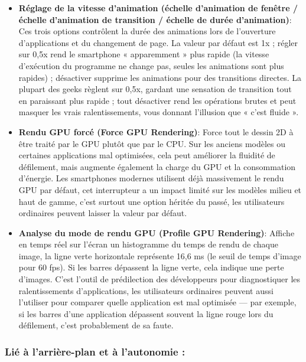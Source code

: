 \begin{itemize}
  \item \textbf{Réglage de la vitesse d'animation (échelle d'animation de fenêtre / échelle d'animation de transition / échelle de durée d'animation)}: Ces trois options contrôlent la durée des animations lors de l'ouverture d'applications et du changement de page. La valeur par défaut est 1x ; régler sur 0,5x rend le smartphone « apparemment » plus rapide (la vitesse d'exécution du programme ne change pas, seules les animations sont plus rapides) ; désactiver supprime les animations pour des transitions directes. La plupart des geeks règlent sur 0,5x, gardant une sensation de transition tout en paraissant plus rapide ; tout désactiver rend les opérations brutes et peut masquer les vrais ralentissements, vous donnant l'illusion que « c'est fluide ».
  \item \textbf{Rendu GPU forcé (Force GPU Rendering)}: Force tout le dessin 2D à être traité par le GPU plutôt que par le CPU. Sur les anciens modèles ou certaines applications mal optimisées, cela peut améliorer la fluidité de défilement, mais augmente également la charge du GPU et la consommation d'énergie. Les smartphones modernes utilisent déjà massivement le rendu GPU par défaut, cet interrupteur a un impact limité sur les modèles milieu et haut de gamme, c'est surtout une option héritée du passé, les utilisateurs ordinaires peuvent laisser la valeur par défaut.
  \item \textbf{Analyse du mode de rendu GPU (Profile GPU Rendering)}: Affiche en temps réel sur l'écran un histogramme du temps de rendu de chaque image, la ligne verte horizontale représente 16,6 ms (le seuil de temps d'image pour 60 fps). Si les barres dépassent la ligne verte, cela indique une perte d'images. C'est l'outil de prédilection des développeurs pour diagnostiquer les ralentissements d'applications, les utilisateurs ordinaires peuvent aussi l'utiliser pour comparer quelle application est mal optimisée — par exemple, si les barres d'une application dépassent souvent la ligne rouge lors du défilement, c'est probablement de sa faute.
\end{itemize}

\subsubsection*{Lié à l'arrière-plan et à l'autonomie :}

